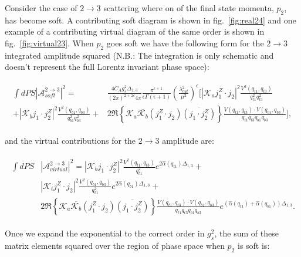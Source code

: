 		Consider the case of $2\rightarrow3$ scattering where on of the final state momenta, $p_2$, has become soft.  A contributing
		soft diagram is shown in fig.~\eqref{fig:real24} and one example of a contributing virtual
		diagram of the same order is shown in fig.~\eqref{fig:virtual23}. When $p_2$ goes soft we have
		the following form for the $2\rightarrow3$ integrated amplitude squared ({N.B.}: The
		integration is only schematic and doesn't represent the full Lorentz invariant phase space):

		\begin{align}
		\begin{split}
			\int dPS|\mathcal{A}^{2\rightarrow3}_{soft}|^2 = &\frac{4C_Ag_s^2\Delta_{1,3}}{(2\pi)^{2+2\epsilon}4\pi}
			\frac{\pi^{\epsilon+1}}{\epsilon\Gamma(\epsilon+1)}
			\left(\frac{\lambda_{cut}^2}{\mu^2}\right)^\epsilon\Bigg[|\mathcal{K}_aj_1^Z\cdot j_2|^2
			\frac{V^2(q_{t1}, q_{t3})}{q^2_{t1}q^2_{t3}} \\
			+ |\mathcal{K}_bj_1\cdot j_2^Z|^2
			\frac{V^2(q_{b1}, q_{b3})}{q^2_{b1}q^2_{b3}} +
			& 2\Re\left\{\mathcal{K}_a\overline{\mathcal{K}_b}
			(j_1^Z\cdot j_2)\overline{(j_1\cdot j_2^Z)}\right\} \frac{V(q_{t1}, q_{t3})
			\cdot V(q_{b1}, q_{b3})}{q_{t1}q_{t3}q_{b1}q_{b3}}\Bigg],
		\end{split}
		\end{align}

		and the virtual contributions for the $2\rightarrow3$ amplitude are:

		\begin{align}
		\begin{split}
			\int dPS&|\mathcal{A}^{2\rightarrow3}_{virtual}|^2 = |\mathcal{K}_bj_1\cdot j_2^Z|^2
			\frac{V^2(q_{t1}, q_{t3})}{q_{t1}^2}e^{2\hat{\alpha}(q_{t1})\Delta_{1,3}} + \\
			&|\mathcal{K}_tj_1^Z\cdot j_2|^2 \frac{V^2(q_{b1}, q_{b3})}{q_{b1}^2}e^{2\hat{\alpha}(q_{b1})\Delta_{1,3}} +  \\
			& 2\Re\left\{\mathcal{K}_a\overline{\mathcal{K}_b}  (j_1^Z\cdot j_2)\overline{(j_1\cdot j_2^Z)}\right\}
			\frac{V(q_{t1}, q_{t3})\cdot V(q_{b1}, q_{b3})}{q_{t1}q_{t3}q_{b1}q_{b3}}e^{(\hat{\alpha}(q_{t1}) +
			\hat{\alpha}(q_{b1}))\Delta_{1,3}}.
		\end{split}
		\end{align}

		Once we expand the exponential to the correct order in $g_s^2$, the sum of these
		matrix elements squared over the region of phase space when $p_2$ is soft is:

